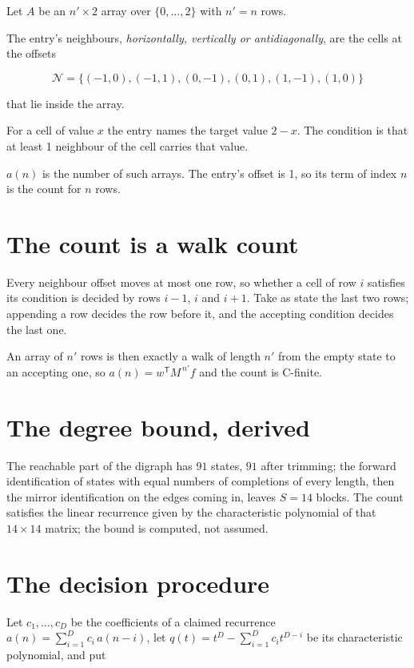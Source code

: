 \documentclass[11pt]{article}
\theoremstyle{definition}
\begin{document}
Let $A$ be an $n' \times 2$ array over $\{0,\dots,2\}$ with $n' = n$ rows.

The entry's neighbours, {\itshape horizontally, vertically or antidiagonally}, are the cells at the offsets

\[\mathcal{N} = \{(-1,0), (-1,1), (0,-1), (0,1), (1,-1), (1,0)\}\]

that lie inside the array.

For a cell of value $x$ the entry names the target value $2 - x$. The condition is that at least 1 neighbour of the cell carries that value.

$a(n)$ is the number of such arrays. The entry's offset is 1, so its term of index $n$ is the count for $n$ rows.

\section{The count is a walk count}

Every neighbour offset moves at most one row, so whether a cell of row $i$ satisfies its condition is decided by rows $i-1$, $i$ and $i+1$. Take as state the last two rows; appending a row decides the row before it, and the accepting condition decides the last one.

An array of $n'$ rows is then exactly a walk of length $n'$ from the empty state to an accepting one, so $a(n) = w^{\mathsf T}M^{\,n'}f$ and the count is C-finite.

\section{The degree bound, derived}

The reachable part of the digraph has $91$ states, $91$ after trimming; the forward identification of states with equal numbers of completions of every length, then the mirror identification on the edges coming in, leaves $S = 14$ blocks. The count satisfies the linear recurrence given by the characteristic polynomial of that $14\times14$ matrix; the bound is computed, not assumed.

\section{The decision procedure}

Let $c_1,\dots,c_D$ be the coefficients of a claimed recurrence $a(n) = \sum_{i=1}^{D} c_i\,a(n-i)$, let $q(t) = t^{D} - \sum_{i=1}^{D} c_i t^{D-i}$ be its characteristic polynomial, and put
\end{document}
